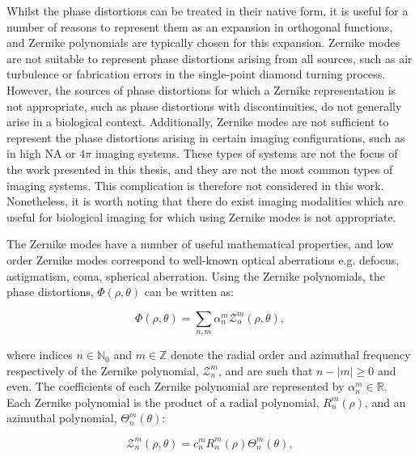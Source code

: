 Whilst the phase distortions can be treated in their native form, it is 
useful for a number of reasons to represent them as an expansion in
orthogonal functions, and Zernike polynomials are typically chosen for 
this expansion\cite{zernike1934diffraction,noll1976zernike,mahajan1994zernike}.
Zernike modes are not suitable to represent phase distortions arising 
from all sources, such as air turbulence or fabrication errors in the 
single-point diamond turning process\cite{wyant1992basic}. However, the 
sources of phase distortions for which a Zernike representation is not
appropriate, such as phase distortions with discontinuities, do not 
generally arise in a biological context. Additionally, Zernike modes are 
not sufficient to represent the phase distortions arising in certain 
imaging configurations, such as in high NA or $4\pi$ imaging 
systems\cite{hao2017aberrations,schwertner2004characterizing,progler2000zernike}. These types of systems are not the focus of the work 
presented in this thesis, and they are not the most common types of  
imaging systems. This complication is therefore not considered in this 
work. Nonetheless, it is worth noting that there do exist 
imaging modalities which are useful for biological imaging for which 
using Zernike modes is not appropriate.

The Zernike modes have a number of useful mathematical properties, and 
low order Zernike modes correspond to well-known optical aberrations e.g. 
defocus, astigmatism, coma, spherical 
aberration\cite{born2013principles,booth2007adaptive,zernike1934diffraction,lakshminarayanan2011zernike}.
Using the Zernike polynomials, the phase distortions, $\Phi\left(\rho,\theta\right)$
can be written as:

\begin{equation}\label{eq:phase_zernike_expansion}
\Phi\left(\rho,\theta\right) = \sum\limits_{n,m}\alpha^{m}_{n}\mathcal{Z}^{m}_{n}\left(\rho,\theta\right),
\end{equation}

where indices $n \in \mathbb{N}_{0}$ and $m \in \mathbb{Z}$ denote the radial order 
and azimuthal frequency respectively of the Zernike polynomial, 
$\mathcal{Z}^{m}_{n}$, and are such that $n - \left|m\right| \ge 0$ and even. The
coefficients of each Zernike polynomial are represented by $\alpha^{m}_{n} \in 
\mathbb{R}$. Each Zernike polynomial is the product of a radial polynomial,
$R^{m}_{n}(\rho)$, and an azimuthal polynomial, $\Theta^{m}_{n}(\theta)$:

\begin{equation}\label{eq:zernike_polynomial}
\mathcal{Z}^{m}_{n}\left(\rho,\theta\right) = c^{m}_{n}R^{m}_{n}(\rho)\Theta^{m}_{n}(\theta),
\end{equation}

